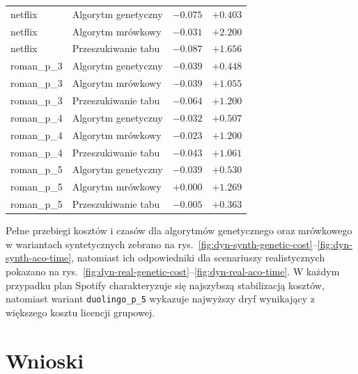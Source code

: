 \begin{table}[H]
\begin{tabular}{llrr}
    netflix               & Algorytm genetyczny & $-0.075$                      & $+0.403$                   \\
    netflix               & Algorytm mrówkowy   & $-0.031$                      & $+2.200$                   \\
    netflix               & Przeszukiwanie tabu & $-0.087$                      & $+1.656$                   \\
    roman\_p\_3           & Algorytm genetyczny & $-0.039$                      & $+0.448$                   \\
    roman\_p\_3           & Algorytm mrówkowy   & $-0.039$                      & $+1.055$                   \\
    roman\_p\_3           & Przeszukiwanie tabu & $-0.064$                      & $+1.200$                   \\
    roman\_p\_4           & Algorytm genetyczny & $-0.032$                      & $+0.507$                   \\
    roman\_p\_4           & Algorytm mrówkowy   & $-0.023$                      & $+1.200$                   \\
    roman\_p\_4           & Przeszukiwanie tabu & $-0.043$                      & $+1.061$                   \\
    roman\_p\_5           & Algorytm genetyczny & $-0.039$                      & $+0.530$                   \\
    roman\_p\_5           & Algorytm mrówkowy   & $+0.000$                      & $+1.269$                   \\
    roman\_p\_5           & Przeszukiwanie tabu & $-0.005$                      & $+0.363$                   \\
  \end{tabular}
\end{table}

Pełne przebiegi kosztów i czasów dla algorytmów genetycznego oraz mrówkowego w wariantach syntetycznych zebrano na rys.~\ref{fig:dyn-synth-genetic-cost}--\ref{fig:dyn-synth-aco-time}, natomiast ich odpowiedniki dla scenariuszy realistycznych pokazano na rys.~\ref{fig:dyn-real-genetic-cost}--\ref{fig:dyn-real-aco-time}. W każdym przypadku plan Spotify charakteryzuje się najszybszą stabilizacją kosztów, natomiast wariant \texttt{duolingo\_p\_5} wykazuje najwyższy dryf wynikający z większego kosztu licencji grupowej.

\section{Wnioski}

